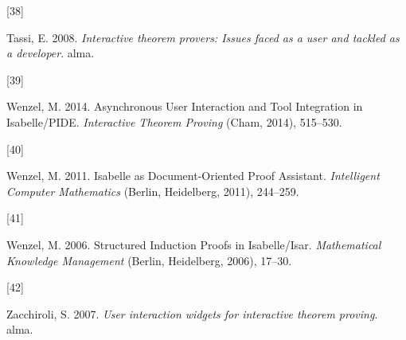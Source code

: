\documentclass[
]{article}
\newlength{\cslhangindent}
\newlength{\csllabelwidth}
\newlength{\cslentryspacingunit} %
\newenvironment{CSLReferences}[2] %
 {%
  \setlength{\parindent}{0pt}
  \ifodd #1
  \let\oldpar\par
  \def\par{\hangindent=\cslhangindent\oldpar}
  \fi
  \setlength{\parskip}{#2\cslentryspacingunit}
 }%
 {}
\newcommand{\CSLLeftMargin}[1]{\parbox[t]{\csllabelwidth}{#1}}
\newcommand{\CSLRightInline}[1]{\parbox[t]{\linewidth - \csllabelwidth}{#1}\break}
\begin{document}
\begin{CSLReferences}{0}{0}
\leavevmode{}%
\CSLLeftMargin{{[}38{]} }
\CSLRightInline{Tassi, E. 2008. \emph{Interactive theorem provers:
Issues faced as a user and tackled as a developer}. alma.}

\leavevmode{}%
\CSLLeftMargin{{[}39{]} }
\CSLRightInline{Wenzel, M. 2014. Asynchronous {User} {Interaction} and
{Tool} {Integration} in {Isabelle}/{PIDE}. \emph{Interactive {Theorem}
{Proving}} (Cham, 2014), 515--530.}

\leavevmode{}%
\CSLLeftMargin{{[}40{]} }
\CSLRightInline{Wenzel, M. 2011. Isabelle as {Document}-{Oriented}
{Proof} {Assistant}. \emph{Intelligent {Computer} {Mathematics}}
(Berlin, Heidelberg, 2011), 244--259.}

\leavevmode{}%
\CSLLeftMargin{{[}41{]} }
\CSLRightInline{Wenzel, M. 2006. Structured {Induction} {Proofs} in
{Isabelle}/{Isar}. \emph{Mathematical {Knowledge} {Management}} (Berlin,
Heidelberg, 2006), 17--30.}

\leavevmode{}%
\CSLLeftMargin{{[}42{]} }
\CSLRightInline{Zacchiroli, S. 2007. \emph{User interaction widgets for
interactive theorem proving}. alma.}

\end{CSLReferences}
\end{document}
